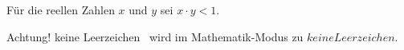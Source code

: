 F\"ur die reellen Zahlen \begin{math}x\end{math} und \(y\) sei $x \cdot y < 1$.

Achtung! \glqq keine Leerzeichen\grqq~ wird im Mathematik-Modus zu \glqq$keine Leerzeichen$\grqq.
